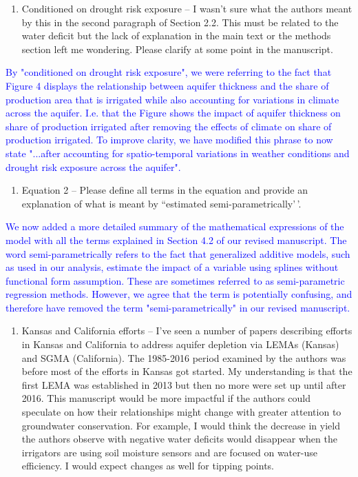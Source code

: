 \documentclass[
]{article}
\providecommand{\tightlist}{%
  \setlength{\itemsep}{0pt}\setlength{\parskip}{0pt}}
\begin{document}
\begin{enumerate}
\def\labelenumi{\arabic{enumi}.}
\setcounter{enumi}{2}
\tightlist
\item
  Conditioned on drought risk exposure -- I wasn't sure what the authors
  meant by this in the second paragraph of Section 2.2. This must be
  related to the water deficit but the lack of explanation in the main
  text or the methods section left me wondering. Please clarify at some
  point in the manuscript.
\end{enumerate}

\textcolor{blue}{By "conditioned on drought risk exposure", we were referring to the fact that Figure 4 displays the relationship between aquifer thickness and the share of production area that is irrigated while also accounting for variations in climate across the aquifer. I.e. that the Figure shows the impact of aquifer thickness on share of production irrigated after removing the effects of climate on share of production irrigated. To improve clarity, we have modified this phrase to now state "...after accounting for spatio-temporal variations in weather conditions and drought risk exposure across the aquifer".}

\begin{enumerate}
\def\labelenumi{\arabic{enumi}.}
\setcounter{enumi}{3}
\tightlist
\item
  Equation 2 -- Please define all terms in the equation and provide an
  explanation of what is meant by ``estimated semi-parametrically'\,'.
\end{enumerate}

\textcolor{blue}{We now added a more detailed summary of the mathematical expressions of the model with all the terms explained in Section 4.2 of our revised manuscript. The word semi-parametrically refers to the fact that generalized additive models, such as used in our analysis, estimate the impact of a variable using splines without functional form assumption. These are sometimes referred to as semi-parametric regression methods. However, we agree that the term is potentially confusing, and therefore have removed the term "semi-parametrically" in our revised manuscript.}

\begin{enumerate}
\def\labelenumi{\arabic{enumi}.}
\setcounter{enumi}{4}
\tightlist
\item
  Kansas and California efforts -- I've seen a number of papers
  describing efforts in Kansas and California to address aquifer
  depletion via LEMAs (Kansas) and SGMA (California). The 1985-2016
  period examined by the authors was before most of the efforts in
  Kansas got started. My understanding is that the first LEMA was
  established in 2013 but then no more were set up until after 2016.
  This manuscript would be more impactful if the authors could speculate
  on how their relationships might change with greater attention to
  groundwater conservation. For example, I would think the decrease in
  yield the authors observe with negative water deficits would disappear
  when the irrigators are using soil moisture sensors and are focused on
  water-use efficiency. I would expect changes as well for tipping
  points.
\end{enumerate}
\end{document}
